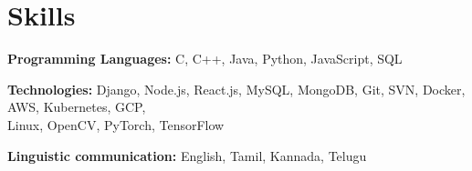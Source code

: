 \documentclass[letterpaper,12pt]{article}
\makeatletter
\newcommand{\resumeItem}[1]{
  \item\small{
    {#1 \vspace{-3pt}}
  }
}
\newcommand{\resumeProjectHeading}[2]{
    \vspace{-3pt}\item
    \begin{tabular*}{0.97\textwidth}{l@{\extracolsep{\fill}}r}
      \small#1 & #2 \\
    \end{tabular*}\vspace{2pt}
}
\newcommand{\resumeSubHeadingListStart}{\begin{itemize}[leftmargin=0.15in, label={}]}
\newcommand{\resumeSubHeadingListEnd}{\end{itemize}}
\newcommand{\resumeItemListStart}{\begin{itemize}}
\newcommand{\resumeItemListEnd}{\end{itemize}\vspace{-5pt}}
\makeatother
\begin{document}
\section{Skills}
  \vspace{3pt}
  \resumeSubHeadingListStart
    \small{\item{
        
        \textbf{Programming Languages:}{ C, C++, Java, Python, JavaScript, SQL} \\ \vspace{3pt}
        
        \textbf{Technologies:}{ Django, Node.js, React.js, MySQL, MongoDB, Git, SVN, Docker, AWS, Kubernetes, GCP, \\ Linux, OpenCV, PyTorch, TensorFlow} \\ \vspace{3pt}

         \textbf{Linguistic communication:}{ English, Tamil, Kannada, Telugu} \\ \vspace{3pt}
    }}
  \resumeSubHeadingListEnd







      
      
\end{document}
